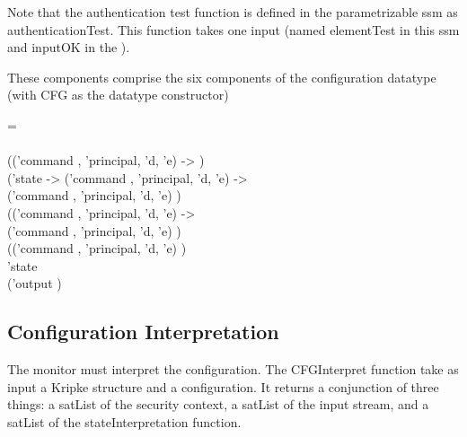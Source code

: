 \documentclass[../../main/main.tex]{subfiles}
\begin{document}
Note that the authentication test function is defined in the parametrizable ssm as authenticationTest.  This function takes one input (named elementTest in this ssm and inputOK in the ).

These components comprise the six components of the configuration datatype (with CFG as the datatype constructor)

\begin{tabbing}
\parskip=8pt
 = \\
\hspace{0.3cm}     \\
\hspace{0.5cm}  (('command , 'principal, 'd, 'e)  -> )\\
\hspace{0.5cm}    ('state -> ('command , 'principal, 'd, 'e)   -> \\
\hspace{0.5cm}    ('command , 'principal, 'd, 'e)  ) \\
 \hspace{0.5cm}   (('command , 'principal, 'd, 'e)   -> \\
\hspace{0.5cm}    ('command , 'principal, 'd, 'e)  ) \\
 \hspace{0.5cm}  (('command , 'principal, 'd, 'e)   ) \\
\hspace{0.5cm}   'state \\
\hspace{0.5cm} ('output )
\parskip=18pt
\end{tabbing}

\subsection{Configuration Interpretation}
The monitor must interpret the configuration.  The CFGInterpret function take as input a Kripke structure and a configuration.  It returns a conjunction of three things: a satList of the security context, a satList of the input stream, and a satList of the stateInterpretation function.  
\end{document}
